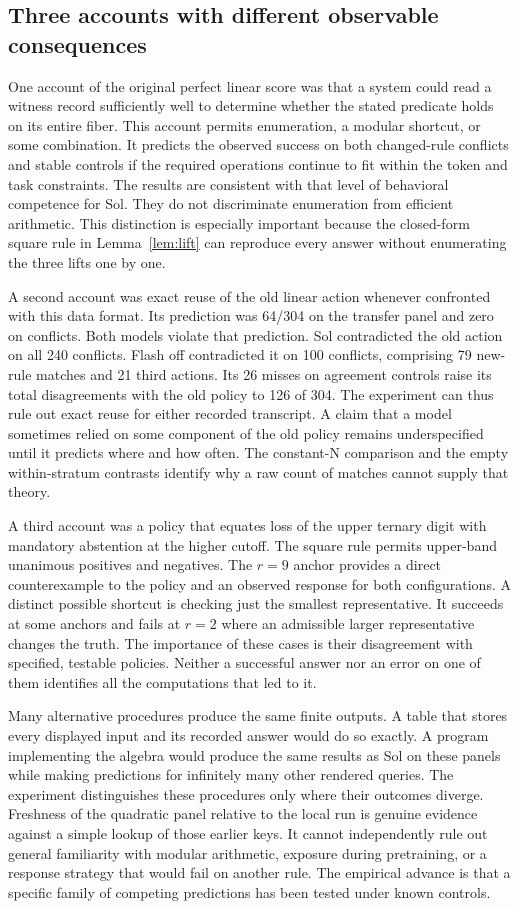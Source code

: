 \documentclass[12pt,letterpaper]{article}
\begin{document}
\subsection{Three accounts with different observable consequences}
One account of the original perfect linear score was that a system could read a witness record sufficiently well to determine whether the stated predicate holds on its entire fiber. This account permits enumeration, a modular shortcut, or some combination. It predicts the observed success on both changed-rule conflicts and stable controls if the required operations continue to fit within the token and task constraints. The results are consistent with that level of behavioral competence for Sol. They do not discriminate enumeration from efficient arithmetic. This distinction is especially important because the closed-form square rule in Lemma~\ref{lem:lift} can reproduce every answer without enumerating the three lifts one by one.

A second account was exact reuse of the old linear action whenever confronted with this data format. Its prediction was 64/304 on the transfer panel and zero on conflicts. Both models violate that prediction. Sol contradicted the old action on all 240 conflicts. Flash off contradicted it on 100 conflicts, comprising 79 new-rule matches and 21 third actions. Its 26 misses on agreement controls raise its total disagreements with the old policy to 126 of 304. The experiment can thus rule out exact reuse for either recorded transcript. A claim that a model sometimes relied on some component of the old policy remains underspecified until it predicts where and how often. The constant-N comparison and the empty within-stratum contrasts identify why a raw count of matches cannot supply that theory.

A third account was a policy that equates loss of the upper ternary digit with mandatory abstention at the higher cutoff. The square rule permits upper-band unanimous positives and negatives. The $r=9$ anchor provides a direct counterexample to the policy and an observed response for both configurations. A distinct possible shortcut is checking just the smallest representative. It succeeds at some anchors and fails at $r=2$ where an admissible larger representative changes the truth. The importance of these cases is their disagreement with specified, testable policies. Neither a successful answer nor an error on one of them identifies all the computations that led to it.

Many alternative procedures produce the same finite outputs. A table that stores every displayed input and its recorded answer would do so exactly. A program implementing the algebra would produce the same results as Sol on these panels while making predictions for infinitely many other rendered queries. The experiment distinguishes these procedures only where their outcomes diverge. Freshness of the quadratic panel relative to the local run is genuine evidence against a simple lookup of those earlier keys. It cannot independently rule out general familiarity with modular arithmetic, exposure during pretraining, or a response strategy that would fail on another rule. The empirical advance is that a specific family of competing predictions has been tested under known controls.
\end{document}

